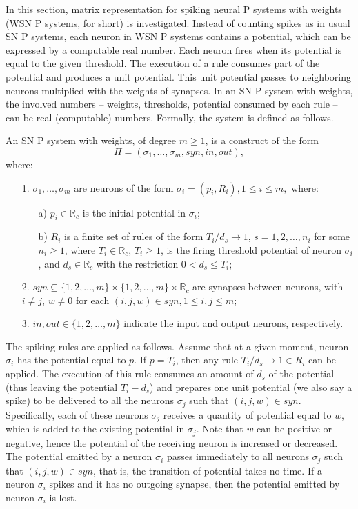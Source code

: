 \documentclass[runningheads]{llncs}
\begin{document}
In this section, matrix representation for spiking neural P systems
with weights (WSN P systems, for short) is investigated. Instead of
counting spikes as in usual SN P systems, each neuron in WSN P
systems contains a potential, which can be expressed by a computable
real number. Each neuron fires when its potential is equal to the
given threshold. The execution of a rule consumes part of the
potential and produces a unit potential. This unit potential passes
to neighboring neurons multiplied with the weights of synapses. In
an SN P system with weights, the involved numbers -- weights,
thresholds, potential consumed by each rule -- can be real
(computable) numbers. Formally, the system is defined as follows.

\begin{definition} An SN P system with weights, of degree $m\geq 1$,
is a construct of the form
$$\Pi=(\sigma_1,\ldots, \sigma_m, syn, in, out),$$
where:
\begin{enumerate}
\item[1.] $\sigma_1,\ldots, \sigma_m$ are neurons of the form
$\sigma_{i}=(p_i, R_i),1\leq i\leq m,$ where:
\begin{enumerate}
\item[a)] $p_i\in \mathbb{R}_c$ is the initial potential in $\sigma_i$;

\item[b)] $R_i$ is a finite set of rules of the form
$T_i/d_s \rightarrow 1$, $s=1,2,\dots,n_i$ for some $n_i\geq 1$,
where $T_i\in \mathbb{R}_c$, $T_i\geq 1$, is the firing threshold
potential of neuron $\sigma_i$, and $d_s\in \mathbb{R}_c$ with the
restriction $0<d_s\leq T_i$;
\end{enumerate}
\item[2.] $syn\subseteq \{1,2,\ldots,m\}\times \{1,2,\ldots,m\}\times
\mathbb{R}_c$ are synapses between neurons, with $i\neq j$, $w\neq
0$ for each $(i,j,w)\in syn, 1\leq i,j \leq m$;

\item[3.] $in, out\in \{1,2,\ldots, m\}$ indicate the input and output neurons, respectively.
\end{enumerate}

\end{definition}

The spiking rules are applied as follows. Assume that at a given
moment, neuron $\sigma_i$ has the potential equal to $p$. If $p =
T_i$, then any rule $T_i/d_s \rightarrow 1 \in R_i$ can be applied.
The execution of this rule consumes an amount of $d_s$ of the
potential (thus leaving the potential $T_i-d_s$) and prepares one
unit potential (we also say a spike) to be delivered to all the
neurons $\sigma_j$ such that $(i,j,w)\in syn$. Specifically, each of
these neurons $\sigma_j$ receives a quantity of potential equal to
$w$, which is added to the existing potential in $\sigma_j$. Note
that $w$ can be positive or negative, hence the potential of the
receiving neuron is increased or decreased. The potential emitted by
a neuron $\sigma_i$ passes immediately to all neurons $\sigma_j$
such that $(i,j,w)\in syn$, that is, the transition of potential
takes no time. If a neuron $\sigma_i$ spikes and it has no outgoing
synapse, then the potential emitted by neuron $\sigma_i$ is lost.
\end{document}
